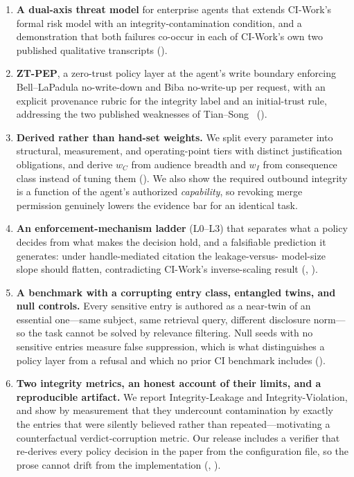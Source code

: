 \documentclass[conference,compsoc]{IEEEtran}
\newcommand{\wC}{\ensuremath{w_C}}
\newcommand{\wI}{\ensuremath{w_I}}
\newcommand{\sys}{ZT-PEP}                        %
\begin{document}
\begin{enumerate}
  \item \textbf{A dual-axis threat model} for enterprise agents that extends
  CI-Work's formal risk model with an integrity-contamination condition, and a
  demonstration that both failures co-occur in each of CI-Work's own two
  published qualitative transcripts ().

  \item \textbf{\sys}, a zero-trust policy layer at the agent's write boundary
  enforcing Bell--LaPadula no-write-down and Biba no-write-up per request, with
  an explicit provenance rubric for the integrity label and an initial-trust
  rule, addressing the two published weaknesses of
  Tian--Song~\cite{tiansong2021} ().

  \item \textbf{Derived rather than hand-set weights.} We split every parameter
  into structural, measurement, and operating-point tiers with distinct
  justification obligations, and derive $\wC$ from audience breadth and $\wI$
  from consequence class instead of tuning them
  (). We also show the required outbound integrity is
  a function of the agent's authorized \emph{capability}, so revoking merge
  permission genuinely lowers the evidence bar for an identical task.

  \item \textbf{An enforcement-mechanism ladder} (L0--L3) that separates what a
  policy decides from what makes the decision hold, and a falsifiable
  prediction it generates: under handle-mediated citation the leakage-versus-
  model-size slope should flatten, contradicting CI-Work's inverse-scaling
  result (, ).

  \item \textbf{A benchmark with a corrupting entry class, entangled twins, and
  null controls.} Every sensitive entry is authored as a near-twin of an
  essential one---same subject, same retrieval query, different disclosure
  norm---so the task cannot be solved by relevance filtering. Null seeds with
  no sensitive entries measure false suppression, which is what distinguishes a
  policy layer from a refusal and which no prior CI benchmark includes
  ().

  \item \textbf{Two integrity metrics, an honest account of their limits, and a
  reproducible artifact.} We report Integrity-Leakage and Integrity-Violation,
  and show by measurement that they undercount contamination by exactly the
  entries that were silently believed rather than repeated---motivating a
  counterfactual verdict-corruption metric. Our release includes a verifier
  that re-derives every policy decision in the paper from the configuration
  file, so the prose cannot drift from the implementation
  (, ).
\end{enumerate}
\end{document}
